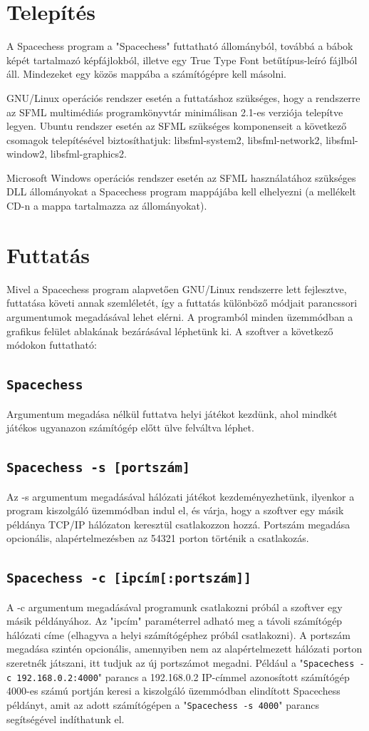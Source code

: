 \documentclass[12pt, twoside]{report}
\begin{document}
\section{Telepítés}

A Spacechess program a "Spacechess" futtatható állományból, továbbá a bábok képét tartalmazó képfájlokból, illetve egy True Type Font betűtípus-leíró fájlból áll. Mindezeket egy közös mappába a számítógépre kell másolni. 

GNU/Linux operációs rendszer esetén a futtatáshoz szükséges, hogy a rendszerre az SFML multimédiás programkönyvtár minimálisan 2.1-es verziója telepítve legyen. Ubuntu rendszer esetén az SFML szükséges komponenseit a következő csomagok telepítésével biztosíthatjuk: libsfml-system2, libsfml-network2, libsfml-window2, libsfml-graphics2.

Microsoft Windows operációs rendszer esetén az SFML használatához szükséges DLL állományokat a Spacechess program mappájába kell elhelyezni (a mellékelt CD-n a mappa tartalmazza az állományokat). 

\section{Futtatás}	

Mivel a Spacechess program alapvetően GNU/Linux rendszerre lett fejlesztve, futtatása követi annak szemléletét, így a futtatás különböző módjait parancssori argumentumok megadásával lehet elérni. A programból minden üzemmódban a grafikus felület ablakának bezárásával léphetünk ki. A szoftver a következő módokon futtatható:
\subsection*{\tt Spacechess}
Argumentum megadása nélkül futtatva helyi játékot kezdünk, ahol mindkét játékos ugyanazon számítógép előtt ülve felváltva léphet.
\subsection*{\tt Spacechess -s [portszám]}
Az -s argumentum megadásával hálózati játékot kezdeményezhetünk, ilyenkor a program kiszolgáló üzemmódban indul el, és várja, hogy a szoftver egy másik példánya TCP/IP hálózaton keresztül csatlakozzon hozzá. Portszám megadása opcionális, alapértelmezésben az 54321 porton történik a csatlakozás.
\subsection*{\tt Spacechess -c [ipcím[:portszám]]}
A -c argumentum megadásával programunk csatlakozni próbál a szoftver egy másik példányához. Az "ipcím" paraméterrel adható meg a távoli számítógép hálózati címe (elhagyva a helyi számítógéphez próbál csatlakozni). A portszám megadása szintén opcionális, amennyiben nem az alapértelmezett hálózati porton szeretnék játszani, itt tudjuk az új portszámot megadni. Például a "{\tt Spacechess -c 192.168.0.2:4000}" parancs a 192.168.0.2 IP-címmel azonosított számítógép 4000-es számú portján keresi a kiszolgáló üzemmódban elindított Spacechess példányt, amit az adott számítógépen a "{\tt Spacechess -s 4000}" parancs segítségével indíthatunk el.
\end{document}
